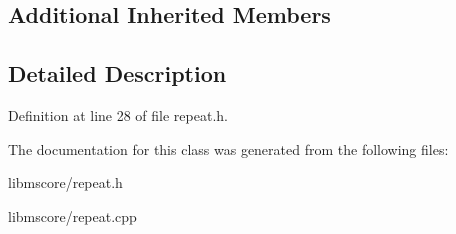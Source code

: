 \subsection*{Additional Inherited Members}


\subsection{Detailed Description}


Definition at line 28 of file repeat.\+h.



The documentation for this class was generated from the following files\+:\begin{DoxyCompactItemize}
\item 
libmscore/repeat.\+h\item 
libmscore/repeat.\+cpp\end{DoxyCompactItemize}
